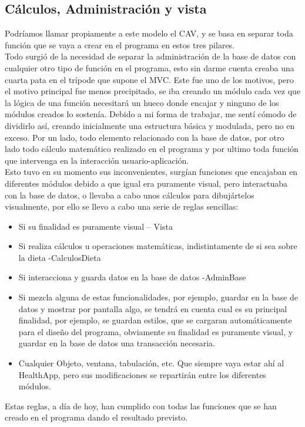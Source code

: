 \subsection{Cálculos, Administración y vista}
Podríamos llamar propiamente a este modelo el CAV, y se basa en separar toda función que se vaya a crear en el programa en estos tres pilares. \\
Todo surgió de la necesidad de separar la administración de la base de datos con cualquier otro tipo de función en el programa, esto sin darme cuenta creaba una cuarta pata en el trípode que supone el MVC. Este fue uno de los motivos, pero el motivo principal fue menos precipitado, se iba creando un módulo cada vez que la lógica de una función necesitará un hueco donde encajar y ninguno de los módulos creados lo sostenía. Debido a mi forma de trabajar, me sentí cómodo de dividirlo así, creando inicialmente una estructura básica y modulada, pero no en exceso. Por un lado, todo elemento relacionado con la base de datos, por otro lado todo cálculo matemático realizado en el programa y por ultimo toda función que intervenga en la interacción usuario-aplicación.\\

Esto tuvo en su momento sus inconvenientes, surgían funciones que encajaban en diferentes módulos debido a que igual era puramente visual, pero interactuaba con la base de datos, o llevaba a cabo unos cálculos para dibujártelos visualmente, por ello se llevo a cabo una serie de reglas sencillas:
\begin{itemize}
\item	Si su finalidad es puramente visual – Vista
\item	Si realiza cálculos u operaciones matemáticas, indistintamente de si sea sobre la dieta -CalculosDieta
\item	Si interacciona y guarda datos en la base de datos -AdminBase
\item	Si mezcla alguna de estas funcionalidades, por ejemplo, guardar en la base de datos y mostrar por pantalla algo, se tendrá en cuenta cual es su principal finalidad, por ejemplo, se guardan estilos, que se cargaran automáticamente para el diseño del programa, obviamente su finalidad es puramente visual, y guardar en la base de datos una transacción necesaria.
\item	Cualquier Objeto, ventana, tabulación, etc. Que siempre vaya estar ahí al HealthApp, pero sus modificaciones se repartirán entre los diferentes módulos.

\end{itemize}
Estas reglas, a día de hoy, han cumplido con todas las funciones que se han creado en el programa dando el resultado previsto.
